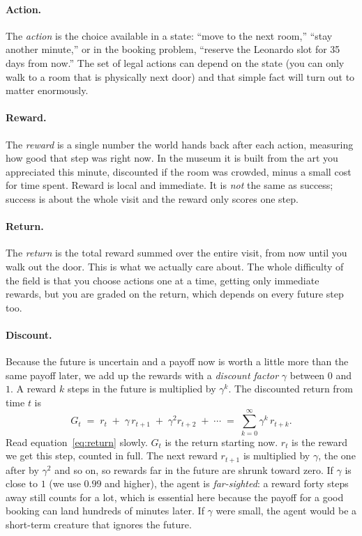 \documentclass[11pt]{article}
\newcommand{\key}[1]{\textit{#1}}            %
\begin{document}
\paragraph{Action.} The \key{action} is the choice available in a state: ``move to the
next room,'' ``stay another minute,'' or in the booking problem, ``reserve the Leonardo
slot for 35 days from now.'' The set of legal actions can depend on the state (you can
only walk to a room that is physically next door) and that simple fact will turn out to
matter enormously.

\paragraph{Reward.} The \key{reward} is a single number the world hands back after each
action, measuring how good that step was right now. In the museum it is built from the
art you appreciated this minute, discounted if the room was crowded, minus a small cost
for time spent. Reward is local and immediate. It is \emph{not} the same as success;
success is about the whole visit and the reward only scores one step.

\paragraph{Return.} The \key{return} is the total reward summed over the entire visit,
from now until you walk out the door. This is what we actually care about. The whole
difficulty of the field is that you choose actions one at a time, getting only immediate
rewards, but you are graded on the return, which depends on every future step too.

\paragraph{Discount.} Because the future is uncertain and a payoff now is worth a little
more than the same payoff later, we add up the rewards with a \key{discount factor}
$\gamma$ between $0$ and $1$. A reward $k$ steps in the future is multiplied by
$\gamma^{k}$. The discounted return from time $t$ is
\begin{equation}
G_t \;=\; r_t \;+\; \gamma\, r_{t+1} \;+\; \gamma^2 r_{t+2} \;+\;\cdots\;=\; \sum_{k=0}^{\infty}\gamma^{k}\, r_{t+k}.
\label{eq:return}
\end{equation}
Read equation~\eqref{eq:return} slowly. $G_t$ is the return starting now. $r_t$ is the
reward we get this step, counted in full. The next reward $r_{t+1}$ is multiplied by
$\gamma$, the one after by $\gamma^2$ and so on, so rewards far in the future are shrunk
toward zero. If $\gamma$ is close to $1$ (we use $0.99$ and higher), the agent is
\key{far-sighted}: a reward forty steps away still counts for a lot, which is essential
here because the payoff for a good booking can land hundreds of minutes later. If
$\gamma$ were small, the agent would be a short-term creature that ignores the future.
\end{document}
